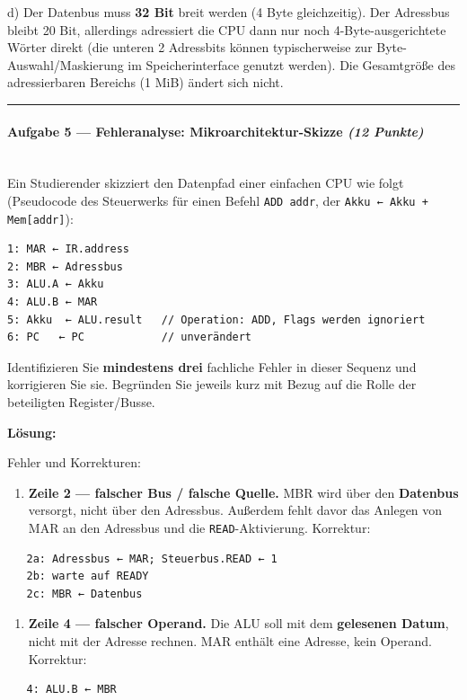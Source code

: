 \documentclass[11pt, a4paper]{article}
\begin{document}
d) Der Datenbus muss \textbf{32 Bit} breit werden (4 Byte gleichzeitig). Der Adressbus bleibt 20 Bit, allerdings adressiert die CPU dann nur noch 4-Byte-ausgerichtete Wörter direkt (die unteren 2 Adressbits können typischerweise zur Byte-Auswahl/Maskierung im Speicherinterface genutzt werden). Die Gesamtgröße des adressierbaren Bereichs (1 MiB) ändert sich nicht.



\noindent\textcolor{rulegray}{\rule{\linewidth}{0.4pt}}


\paragraph{Aufgabe 5 — Fehleranalyse: Mikroarchitektur-Skizze \textit{(12 Punkte)}}\mbox{}\\[2pt]

Ein Studierender skizziert den Datenpfad einer einfachen CPU wie folgt (Pseudocode des Steuerwerks für einen Befehl \texttt{ADD addr}, der \texttt{Akku ← Akku + Mem[addr]}):


\begin{lstlisting}
1: MAR ← IR.address
2: MBR ← Adressbus
3: ALU.A ← Akku
4: ALU.B ← MAR
5: Akku  ← ALU.result   // Operation: ADD, Flags werden ignoriert
6: PC   ← PC            // unverändert
\end{lstlisting}


Identifizieren Sie \textbf{mindestens drei} fachliche Fehler in dieser Sequenz und korrigieren Sie sie. Begründen Sie jeweils kurz mit Bezug auf die Rolle der beteiligten Register/Busse.


\textbf{Lösung:}


Fehler und Korrekturen:


\begin{enumerate}
  \item \textbf{Zeile 2 — falscher Bus / falsche Quelle.} MBR wird über den \textbf{Datenbus} versorgt, nicht über den Adressbus. Außerdem fehlt davor das Anlegen von MAR an den Adressbus und die \texttt{READ}-Aktivierung. Korrektur:
\end{enumerate}
\begin{lstlisting}
   2a: Adressbus ← MAR; Steuerbus.READ ← 1
   2b: warte auf READY
   2c: MBR ← Datenbus
\end{lstlisting}


\begin{enumerate}
  \item \textbf{Zeile 4 — falscher Operand.} Die ALU soll mit dem \textbf{gelesenen Datum}, nicht mit der Adresse rechnen. MAR enthält eine Adresse, kein Operand. Korrektur:
\end{enumerate}
\begin{lstlisting}
   4: ALU.B ← MBR
\end{lstlisting}
\end{document}
